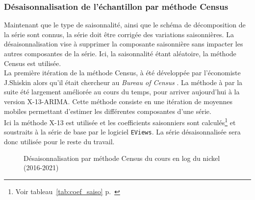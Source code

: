 \subsubsection{Désaisonnalisation de l'échantillon par méthode Census}
Maintenant que le type de saisonnalité, ainsi que le schéma de décomposition de la série sont connus, la série doit être corrigée des variations saisonnières. La 
désaisonnalisation vise à supprimer la composante saisonnière sans impacter les autres composantes de la série. Ici, la saisonnalité étant aléatoire, la méthode Census
est utilisée.\\[11pt]
La première itération de la méthode Census, à été développée par l'économiste J.Shiskin alors qu'il était chercheur au \textit{Bureau of Census} . La méthode à par la 
suite été largement améliorée au cours du temps, pour arriver aujourd'hui à la version X-13-ARIMA. Cette méthode consiste en une itération de moyennes mobiles permettant 
d'estimer les différentes composantes d'une série.\\[11pt]
Ici la méthode X-13 est utilisée et les coefficients saisonniers sont calculés\footnote{Voir tableau~\ref{tab:coef_saiso} p.~\pageref{tab:coef_saiso}} et soustraits à la série de base par le logiciel \texttt{EViews}. La série désaisonnalisée sera donc utilisée pour le reste du travail.
\begin{figure}[H]
    \centering
    
    \caption{Désaisonnalisation par méthode Census du cours en log du nickel (2016-2021)}
\end{figure}